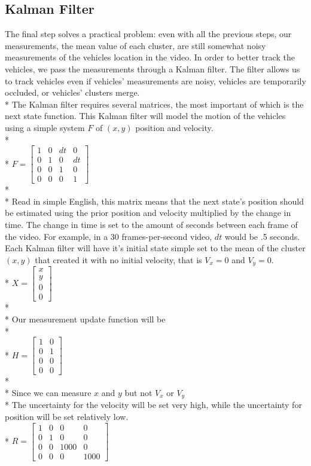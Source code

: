\documentclass[draft]{article} %
\begin{document}
\subsection{Kalman Filter}
The final step solves a practical problem: even with all the previous steps, our measurements, the mean value of each cluster, are still somewhat noisy measurements of the vehicles location in the video. In order to better track the vehicles, we pass the measurements through a Kalman filter. The filter allows us to track vehicles even if vehicles' measurements are noisy, vehicles are temporarily occluded, or vehicles' clusters merge. \\*
The Kalman filter requires several matrices, the most important of which is the next state function. This Kalman filter will model the motion of the vehicles using a simple system $F$ of $(x,y)$ position and velocity. \\*
\\*
$F = \begin{bmatrix}
1 & 0 & dt & 0\\
0 & 1 & 0 & dt\\
0 & 0 & 1 & 0\\
0 & 0 & 0 & 1\end{bmatrix}$\\*\\*
Read in simple English, this matrix means that the next state's position should be estimated using the prior position and velocity multiplied by the change in time. The change in time is set to the amount of seconds between each frame of the video. For example, in a 30 frames-per-second video, $dt$ would be .5 seconds.
Each Kalman filter will have it's initial state simple set to the mean of the cluster $(x,y)$ that created it with no initial velocity, that is $V_x = 0$ and $V_y = 0$.\\*
$X = \begin{bmatrix}
x \\
y \\
0 \\
0 \end{bmatrix}$\\*\\*
Our measurement update function will be \\*\\*
$H = \begin{bmatrix}
1 & 0 \\
0 & 1 \\
0 & 0 \\
0 & 0 \end{bmatrix}$\\*\\*
Since we can measure $x$ and $y$ but not $V_x$ or $V_y$\\*
The uncertainty for the velocity will be set very high, while the uncertainty for position will be set relatively low.\\*
$R = \begin{bmatrix}
 1 & 0 & 0 & 0\\
 0 & 1 & 0 & 0\\
 0 & 0 & 1000 & 0\\
 0 & 0 & 0 & 1000\end{bmatrix}$
\end{document}
